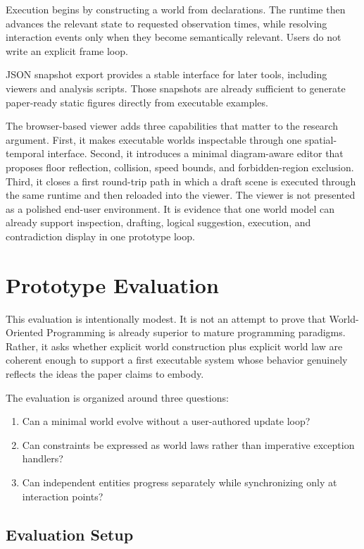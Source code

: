 \documentclass[sigplan,review,anonymous]{acmart}
\begin{document}
Execution begins by constructing a world from declarations.
The runtime then advances the relevant state to requested observation times, while resolving interaction events only when they become semantically relevant.
Users do not write an explicit frame loop.

JSON snapshot export provides a stable interface for later tools, including viewers and analysis scripts.
Those snapshots are already sufficient to generate paper-ready static figures directly from executable examples.

The browser-based viewer adds three capabilities that matter to the research argument.
First, it makes executable worlds inspectable through one spatial-temporal interface.
Second, it introduces a minimal diagram-aware editor that proposes floor reflection, collision, speed bounds, and forbidden-region exclusion.
Third, it closes a first round-trip path in which a draft scene is executed through the same runtime and then reloaded into the viewer.
The viewer is not presented as a polished end-user environment.
It is evidence that one world model can already support inspection, drafting, logical suggestion, execution, and contradiction display in one prototype loop.

\section{Prototype Evaluation}

This evaluation is intentionally modest.
It is not an attempt to prove that World-Oriented Programming is already superior to mature programming paradigms.
Rather, it asks whether explicit world construction plus explicit world law are coherent enough to support a first executable system whose behavior genuinely reflects the ideas the paper claims to embody.

The evaluation is organized around three questions:
\begin{enumerate}
\item Can a minimal world evolve without a user-authored update loop?
\item Can constraints be expressed as world laws rather than imperative exception handlers?
\item Can independent entities progress separately while synchronizing only at interaction points?
\end{enumerate}

\subsection{Evaluation Setup}
\end{document}
